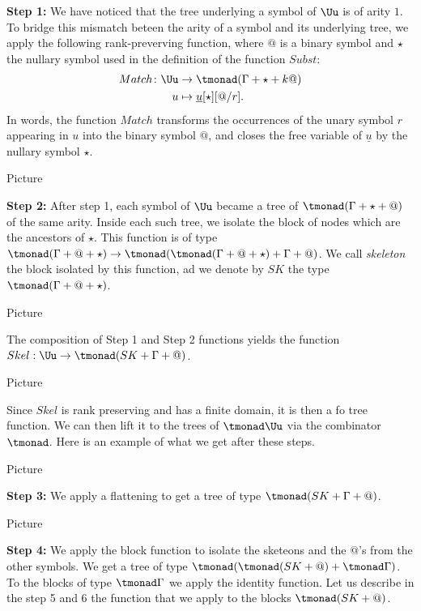 \medskip
\noindent\textbf{Step 1:} We have noticed that the tree underlying a symbol of $\Uu$ is of arity $1$. To bridge this mismatch beteen the arity of a symbol and its underlying tree, we apply the following
rank-preverving function, where $@$ is a binary symbol and $\star$ the nullary symbol used in the definition of the function $Subst$:
 \begin{align*}
  Match\colon \Uu &\to \tmonad(\Gamma+\star+k@)\\
  u &\mapsto \underline{u}[\star][@/r].
\end{align*} 
In words, the function $Match$ transforms the occurrences of the unary symbol $r$ appearing in $u$ into the binary symbol $@$, and closes the free variable of $\underline{u}$ by the nullary symbol $\star$.
\begin{center}
Picture
\end{center}
\medskip
\textbf{Step 2:} After step 1, each symbol of $\Uu$ became a tree of $\tmonad(\Gamma+\star+@)$ of the same arity. Inside each such tree, we isolate the block of nodes which are the ancestors of $\star$. This function is of type $\tmonad(\Gamma+@+\star)\to \tmonad (\tmonad (\Gamma+@+\star)+\Gamma+@)$. We call \emph{skeleton} the block isolated by this function, ad we denote by 
$SK$ the type $\tmonad (\Gamma+@+\star)$.
\begin{center}
Picture
\end{center}
The composition of Step 1 and Step 2 functions yields the function $Skel:\Uu\to \tmonad (SK+\Gamma+@)$. 
\begin{center}
Picture
\end{center}
Since $Skel$ is rank preserving and has a finite domain, it is then a fo tree function. We can then lift it to the trees of $\tmonad \Uu$ via the combinator $\tmonad$. Here is an example of what we get after these steps.
\begin{center}
Picture
\end{center}
 \medskip
\textbf{Step 3:} We apply a flattening to get a tree of type $\tmonad(SK+\Gamma+@)$. 
\begin{center}
Picture
\end{center}
\medskip
\textbf{Step 4:} We apply the block function to isolate the sketeons and the $@$'s from the other symbols. We get a tree of type $\tmonad (\tmonad(SK+@)+\tmonad\Gamma)$. To the blocks of type $\tmonad \Gamma$ we apply the identity function. Let us describe in the step 5 and 6 the function that we apply to the blocks $\tmonad(SK+@)$.

